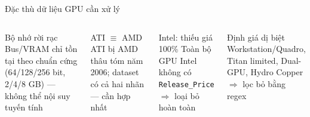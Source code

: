 \documentclass[13pt, aspectratio=169]{beamer}
\begin{document}
\begin{frame}{Đặc thù dữ liệu GPU cần xử lý}
  \begin{columns}[T]
      \begin{exampleblock}{\footnotesize Bộ nhớ rời rạc}
        \footnotesize Bus/VRAM chỉ tồn tại theo chuẩn cứng (64/128/256 bit, 2/4/8 GB) --- không thể nội suy tuyến tính
      \end{exampleblock}
      \vspace{0.35em}
      \begin{exampleblock}{\footnotesize ATI $\equiv$ AMD}
        \footnotesize ATI bị AMD thâu tóm năm 2006; dataset có cả hai nhãn --- cần hợp nhất
      \end{exampleblock}
      \begin{alertblock}{\footnotesize Intel: thiếu giá 100\%}
        \footnotesize Toàn bộ GPU Intel không có \texttt{Release\_Price} $\Rightarrow$ loại bỏ hoàn toàn
      \end{alertblock}
      \vspace{0.35em}
      \begin{alertblock}{\footnotesize Định giá dị biệt}
        \footnotesize Workstation/Quadro, Titan limited, Dual-GPU, Hydro Copper $\Rightarrow$ lọc bỏ bằng regex
      \end{alertblock}
  \end{columns}
\end{frame}
\end{document}
